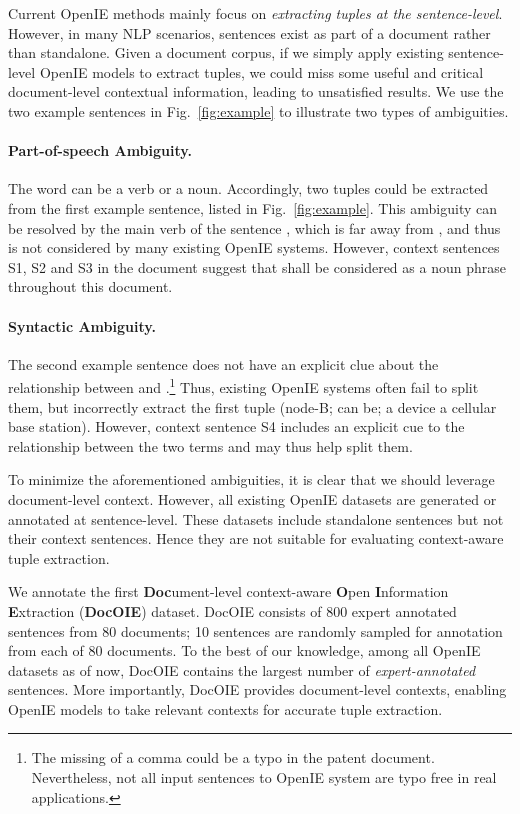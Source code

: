 \documentclass[11pt,a4paper]{article}
\newcommand{\dname}{DocOIE\xspace}
\begin{document}
Current OpenIE methods mainly focus on \textit{extracting tuples at the sentence-level}. However, in many NLP scenarios, sentences exist as part of a document rather than standalone. Given a document corpus, if we simply apply existing sentence-level OpenIE models to extract tuples, we could miss some useful and critical document-level contextual information, leading to unsatisfied results. We use the two example sentences in Fig.~\ref{fig:example} to illustrate two types of ambiguities. 

\paragraph{Part-of-speech Ambiguity.} The word  can be a verb or a noun. Accordingly, two tuples could be extracted from the first example sentence, listed in Fig.~\ref{fig:example}.
This ambiguity can be resolved by the main verb of the sentence , which is far away from , and thus is not considered by many existing OpenIE systems. However, context sentences S1, S2 and S3 in the document suggest that  shall be considered as a noun phrase throughout this document. 

\paragraph{Syntactic Ambiguity.} The second example sentence does not have an explicit clue about the relationship between  and .\footnote{The missing of a comma could be a typo in the patent document. Nevertheless, not all input sentences to OpenIE system are typo free in real applications.} Thus, existing OpenIE systems often fail to split them, but incorrectly extract the first tuple (node-B; can be; a device a cellular base station). However, context sentence S4 includes an explicit cue to the relationship between the two terms and may thus help split them.

To minimize the aforementioned ambiguities, it is clear that we should leverage document-level context. However, all existing OpenIE datasets are generated or annotated at sentence-level. These datasets include standalone sentences but not their context sentences. Hence they are not suitable for evaluating context-aware tuple extraction.

We annotate the first \textbf{Doc}ument-level context-aware \textbf{O}pen \textbf{I}nformation \textbf{E}xtraction (\textbf{\dname}) dataset. \dname consists of 800 expert annotated sentences from 80 documents; 10 sentences are randomly sampled for annotation from each of 80 documents. To the best of our knowledge, among all OpenIE datasets as of now, 
\dname  contains the largest number of \textit{expert-annotated} sentences. More importantly, \dname provides  document-level contexts, enabling OpenIE models to take relevant contexts for accurate tuple extraction.
\end{document}
